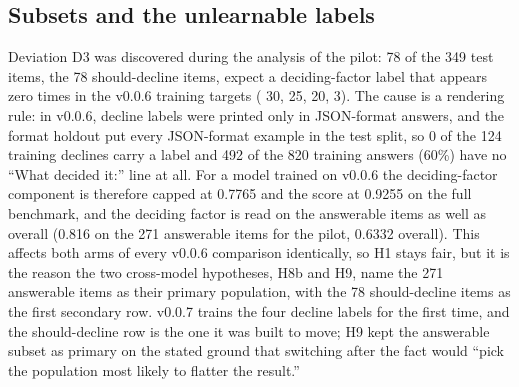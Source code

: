 \subsection{Subsets and the unlearnable labels}
Deviation D3 was discovered during the analysis of the pilot: 78 of the 349 test items, the 78 should-decline items, expect a deciding-factor label that appears zero times in the v0.0.6 training targets ( 30,  25,  20,  3). The cause is a rendering rule: in v0.0.6, decline labels were printed only in JSON-format answers, and the format holdout put every JSON-format example in the test split, so 0 of the 124 training declines carry a label and 492 of the 820 training answers (60\%) have no ``What decided it:'' line at all. For a model trained on v0.0.6 the deciding-factor component is therefore capped at 0.7765 and the score at 0.9255 on the full benchmark, and the deciding factor is read on the answerable items as well as overall (0.816 on the 271 answerable items for the pilot, 0.6332 overall). This affects both arms of every v0.0.6 comparison identically, so H1 stays fair, but it is the reason the two cross-model hypotheses, H8b and H9, name the 271 answerable items as their primary population, with the 78 should-decline items as the first secondary row. v0.0.7 trains the four decline labels for the first time, and the should-decline row is the one it was built to move; H9 kept the answerable subset as primary on the stated ground that switching after the fact would ``pick the population most likely to flatter the result.''


